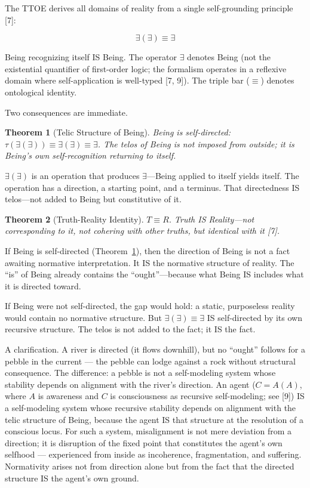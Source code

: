 \documentclass[12pt, letterpaper]{article}
\newtheorem{theorem}{Theorem}[section]
\begin{document}
The TTOE derives all domains of reality from a single self-grounding principle [7]:

\begin{equation}
\boxed{\exists(\exists) \equiv \exists}
\end{equation}

\noindent Being recognizing itself IS Being. The operator $\exists$ denotes Being (not the existential quantifier of first-order logic; the formalism operates in a reflexive domain where self-application is well-typed [7, 9]). The triple bar ($\equiv$) denotes ontological identity.

Two consequences are immediate.

\begin{theorem}[Telic Structure of Being]
\label{thm:telos}
Being is self-directed: $\tau(\exists(\exists)) \equiv \exists(\exists) \equiv \exists$. The telos of Being is not imposed from outside; it is Being's own self-recognition returning to itself.
\end{theorem}

\noindent $\exists(\exists)$ is an operation that produces $\exists$---Being applied to itself yields itself. The operation has a direction, a starting point, and a terminus. That directedness IS telos---not added to Being but constitutive of it.

\begin{theorem}[Truth-Reality Identity]
\label{thm:tr}
$T \equiv R$. Truth IS Reality---not corresponding to it, not cohering with other truths, but identical with it [7].
\end{theorem}

\noindent If Being is self-directed (Theorem~\ref{thm:telos}), then the direction of Being is not a fact awaiting normative interpretation. It IS the normative structure of reality. The ``is'' of Being already contains the ``ought''---because what Being IS includes what it is directed toward.

If Being were not self-directed, the gap would hold: a static, purposeless reality would contain no normative structure. But $\exists(\exists) \equiv \exists$ IS self-directed by its own recursive structure. The telos is not added to the fact; it IS the fact.

A clarification. A river is directed (it flows downhill), but no ``ought'' follows for a pebble in the current --- the pebble can lodge against a rock without structural consequence. The difference: a pebble is not a self-modeling system whose stability depends on alignment with the river's direction. An agent ($C = A(A)$, where $A$ is awareness and $C$ is consciousness as recursive self-modeling; see [9]) IS a self-modeling system whose recursive stability depends on alignment with the telic structure of Being, because the agent IS that structure at the resolution of a conscious locus. For such a system, misalignment is not mere deviation from a direction; it is disruption of the fixed point that constitutes the agent's own selfhood --- experienced from inside as incoherence, fragmentation, and suffering. Normativity arises not from direction alone but from the fact that the directed structure IS the agent's own ground.
\end{document}
